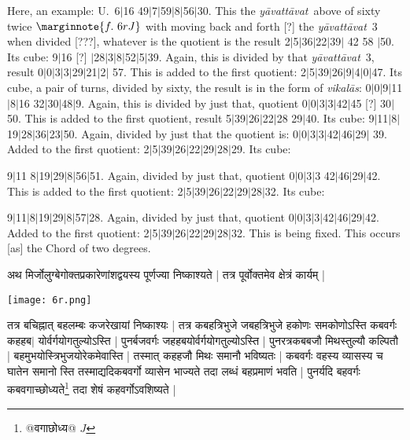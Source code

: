 \documentclass[12pt]{book}
\def\ya{\textit{y\=avat\-t\=avat}}
\def\vikalas{\textit{vi\-ka\-l\=as}}
\def\danda{$|$}
\begin{document}
\newpage

Here, an example: U.\ 6\danda 16  49\danda 7\danda 59\danda 8\danda 56\danda 30. 
This the \ya\ above of sixty twice
$\marginnote{f.~6r J} $
with moving back and forth [?] the \ya\ 3 when divided [???],
whatever is the quotient is the result 2\danda 5\danda 36\danda 22\danda 39\danda
42 58 \danda 50. Its cube: 9\danda 16 [?] \danda 28\danda 3\danda 8\danda 52\danda 5\danda 39.
Again, this is divided by that \ya\ 3, result 0\danda 0\danda 3\danda 3\danda 29\danda 21\danda 2\danda 
57. This is added to the first quotient: 2\danda 5\danda 39\danda 26\danda 9\danda 4\danda 0\danda 47.
Its cube, a pair of turns, divided by sixty, the result is in the form of \vikalas: 
0\danda 0\danda 9\danda 11\danda 8\danda 16 32\danda 30\danda 48\danda 9.
Again, this is divided by just that, quotient 0\danda 0\danda 3\danda 3\danda 42\danda 45 [?]
30\danda 50. This is added to the first quotient, result 5\danda 39\danda 26\danda 22\danda 28
29\danda 40. Its cube: 9\danda 11\danda 8\danda 19\danda 28\danda 36\danda 23\danda 50.
Again, divided by just that the quotient is: 0\danda 0\danda 3\danda 3\danda 42\danda 46\danda 29\danda
39. Added to the first quotient: 2\danda 5\danda 39\danda 26\danda 22\danda 29\danda 28\danda 29. 
Its cube: 

9\danda 11 8\danda 19\danda 29\danda 8\danda 56\danda 51. Again, divided by just that,
quotient 0\danda 0\danda 3\danda 3 42\danda 46\danda 29\danda 42. This is added to the first 
quotient: 2\danda 5\danda 39\danda 26\danda 22\danda 29\danda 28\danda 32. Its cube: 

9\danda 11\danda 8\danda 19\danda 29\danda 8\danda 57\danda 28. Again, divided by just that,
quotient 0\danda 0\danda 3\danda 3\danda 42\danda 46\danda 29\danda 42. 
Added to the first quotient: 2\danda 5\danda 39\danda 26\danda 22\danda 29\danda 28\danda 32.
This is being fixed. This occurs [as] the Chord of two degrees.

\newpage

{\s अथ मिर्जोलुग्बेगोक्तप्रकारेणांशद्वयस्य पूर्णज्या निष्काश्यते | तत्र पूर्वोक्तमेव क्षेत्रं
कार्यम् |} \\ 

\begin{center}
\texttt{[image: 6r.png]}
\end{center}
 
{\s तत्र बचिह्नात् बहलम्बः कजरेखायां निष्काश्यः | तत्र कबहत्रिभुजे जबहत्रिभुजे हकोणः समकोणोऽस्ति कबवर्गः कहहब$|$
योर्वर्गयोगतुल्योऽस्ति | पुनर्बजवर्गः जहहबयोर्वर्गयोगतुल्योऽस्ति | 
पुनरत्रकबबजौ मिथस्तुल्यौ कल्पितौ | बहमुभ\-योस्त्रिभुजयोरेकमेवास्ति | तस्मात् कहहजौ मिथः समानौ भविष्यतः | कबवर्गः वहस्य व्यासस्य च घातेन समानो स्ति तस्माद्यदिकबवर्गो व्यासेन भाज्यते तदा लब्धं बहप्रमाणं भवति |
पुनर्यदि बहवर्गः कबवगाच्छोध्यते\footnote{{\s @वगाछोध्य@} $J$ } तदा शेषं कहवर्गोऽवशिष्यते |} 
\end{document}
